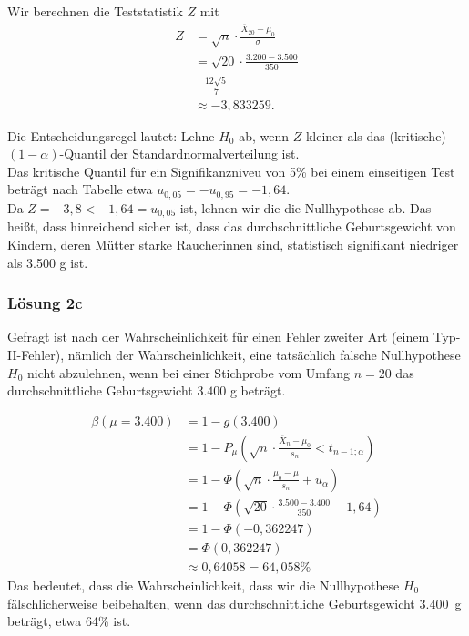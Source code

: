 \documentclass[main.tex]{subfiles}
\begin{document}
Wir berechnen die Teststatistik $Z$ mit
$$\begin{aligned}
	Z &= \sqrt{n} \cdot \frac{\overline{X}_{20} - \mu_0}{\sigma} \\[2mm]
    &= \sqrt{20} \cdot \frac{3.200 - 3.500}{350} \\[2mm]
    & -\frac{12\sqrt{5}}{7} \\[2mm]
    &\approx -3,833259.
\end{aligned}$$

Die Entscheidungsregel lautet: Lehne $H_0$ ab, wenn $Z$ kleiner als das (kritische) $(1-\alpha)$-Quantil der Standardnormalverteilung ist.\\

Das kritische Quantil für ein Signifikanzniveu von 5\% bei einem einseitigen Test beträgt nach Tabelle etwa $u_{0,05} = - u_{0,95} = - 1,64$.\\

Da $Z = -3,8 < -1,64 = u_{0,05}$ ist, lehnen wir die die Nullhypothese ab. Das heißt, dass hinreichend sicher ist, dass das durchschnittliche Geburtsgewicht von Kindern, deren Mütter starke Raucherinnen sind, statistisch signifikant niedriger als 3.500 g ist.

\subsubsection{Lösung 2c}
Gefragt ist nach der Wahrscheinlichkeit für einen Fehler zweiter Art (einem Typ-II-Fehler), nämlich der Wahrscheinlichkeit, eine tatsächlich falsche Nullhypothese $H_0$ nicht abzulehnen, wenn bei einer Stichprobe vom Umfang $n=20$ das durchschnittliche Geburtsgewicht $3.400$ g beträgt. 

$$\begin{aligned}
    \beta(\mu=3.400) &= 1 - g(3.400) \\
    &= 1 - P_\mu \left( \sqrt{n} \cdot \frac{\overline{X}_n - \mu_0}{s_n} < t_{n-1; \alpha} \right) \\
    &= 1 - \Phi \left(\sqrt{n}\cdot \frac{\mu_0 - \mu}{s_n} + u_{\alpha} \right) \\
    &= 1 - \Phi \left(\sqrt{20}\cdot \frac{3.500-3.400}{350} -1,64 \right) \\
    &= 1 - \Phi \left( -0,362247 \right) \\
    &= \Phi \left( 0,362247 \right)\\
    &\approx 0,64058 = 64,058\%
\end{aligned}$$
Das bedeutet, dass die Wahrscheinlichkeit, dass wir die Nullhypothese $H_0$ fälschlicherweise beibehalten, wenn das durchschnittliche Geburtsgewicht $3.400$~g beträgt, etwa 64\% ist.
\end{document}
